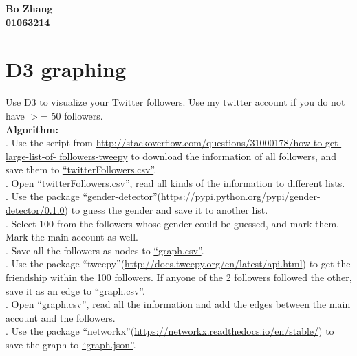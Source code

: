 \documentclass{article}
\begin{document}
		\begin{center}\textbf{Bo Zhang\\01063214}
		\end{center}
		\section{D3 graphing}
		Use D3 to visualize your Twitter followers. Use my twitter account if you do not have $>$= 50 followers.\\

		\noindent\textbf{Algorithm: }\\
		. Use the script from \url{http://stackoverflow.com/questions/31000178/how-to-get-large-list-of-
followers-tweepy} to download the information of all followers, and save them to \href{https://github.com/zhangboroy/cs532-s17/blob/master/assg06_submission/twitterFollowers.csv}{``twitterFollowers.csv''}.\\
		. Open \href{https://github.com/zhangboroy/cs532-s17/blob/master/assg06_submission/twitterFollowers.csv}{``twitterFollowers.csv''}, read all kinds of the information to different lists.\\
		. Use the package ``gender-detector''(\url{https://pypi.python.org/pypi/gender-detector/0.1.0}) to guess the gender and save it to another list.\\
		. Select 100 from the followers whose gender could be guessed, and mark them. Mark the main account as well.\\
		. Save all the followers as nodes to \href{https://github.com/zhangboroy/cs532-s17/blob/master/assg06_submission/graph.csv}{``graph.csv''}.\\
		. Use the package ``tweepy''(\url{http://docs.tweepy.org/en/latest/api.html}) to get the friendship within the 100 followers. If anyone of the 2 followers followed the other, save it as an edge to \href{https://github.com/zhangboroy/cs532-s17/blob/master/assg06_submission/graph.csv}{``graph.csv''}.\\
		. Open \href{https://github.com/zhangboroy/cs532-s17/blob/master/assg06_submission/graph.csv}{``graph.csv''}, read all the information and add the edges between the main account and the followers.\\
		. Use the package ``networkx''(\url{https://networkx.readthedocs.io/en/stable/}) to save the graph to \href{https://github.com/zhangboroy/cs532-s17/blob/master/assg06_submission/graph.json}{``graph.json''}.\\
\end{document}

